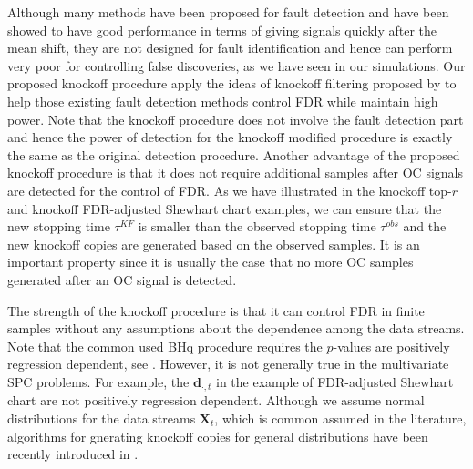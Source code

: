 \documentclass[]{interact}
\theoremstyle{plain}%
\theoremstyle{definition}
\theoremstyle{remark}
\begin{document}
Although many methods have been proposed for fault detection and have been showed to have good performance in terms of giving signals quickly after the mean shift, they are not designed for fault identification and hence can perform very poor for controlling false discoveries, as we have seen in our simulations. Our proposed knockoff procedure apply the ideas of knockoff filtering proposed by \cite{barber2015controlling} to help those existing fault detection methods control FDR while maintain high power. Note that the knockoff procedure does not involve the fault detection part and hence the power of detection for the knockoff modified procedure is exactly the same as the original detection procedure. Another advantage of the proposed knockoff procedure is that it does not require additional samples after OC signals are detected for the control of FDR. As we have illustrated in the knockoff top-$r$ and knockoff FDR-adjusted Shewhart chart examples, we can ensure that the new stopping time $\tau^{KF}$ is smaller than the observed stopping time $\tau^{obs}$ and the new knockoff copies are generated based on the observed samples. It is an important property since it is usually the case that no more OC samples generated after an OC signal is detected.

The strength of the knockoff procedure is that it can control FDR in finite samples without any assumptions about the dependence among the data streams. Note that the common used BHq procedure requires the $p$-values are positively regression dependent, see \cite{benjamini2006adaptive}. However, it is not generally true in the multivariate SPC problems. For example, the $\mathbf{d}_{\cdot,t}$ in the  
example of FDR-adjusted Shewhart chart are not positively regression dependent. Although we assume normal distributions for the data streams $\mathbf{X}_t$, which is common assumed in the literature, algorithms for gnerating knockoff copies for general distributions have been recently introduced in \cite{BatesEtAl2020}.








\appendix
\setcounter{equation}{0} 
\renewcommand{\theequation}{A\arabic{equation}}
\end{document}
